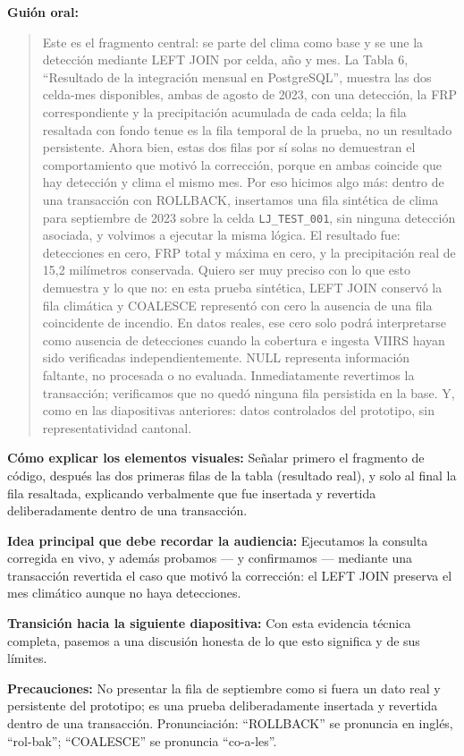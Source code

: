 \documentclass[11pt,a4paper]{article}
\newcommand{\campo}[2]{\par\medskip\noindent\textbf{#1:} #2\par}
\newenvironment{guionoral}{%
  \medskip\noindent\textbf{Gui\'on oral:}\par\smallskip
  \begin{quote}\small
}{%
  \end{quote}
}
\begin{document}
\begin{guionoral}
Este es el fragmento central: se parte del clima como base y se une la
detecci\'on mediante LEFT JOIN por celda, a\~no y mes. La Tabla 6,
``Resultado de la integraci\'on mensual en PostgreSQL'', muestra las
dos celda-mes disponibles, ambas de agosto de 2023, con una detecci\'on,
la FRP correspondiente y la precipitaci\'on acumulada de cada celda; la
fila resaltada con fondo tenue es la fila temporal de la prueba, no un
resultado persistente. Ahora bien, estas dos filas por s\'i solas no
demuestran el comportamiento que motiv\'o la correcci\'on, porque en
ambas coincide que hay detecci\'on y clima el mismo mes. Por eso
hicimos algo m\'as: dentro de una transacci\'on con ROLLBACK,
insertamos una fila sint\'etica de clima para septiembre de 2023 sobre
la celda \texttt{LJ\_TEST\_001}, sin ninguna detecci\'on asociada, y
volvimos a ejecutar la misma l\'ogica. El resultado fue: detecciones en
cero, FRP total y m\'axima en cero, y la precipitaci\'on real de 15,2
mil\'imetros conservada. Quiero ser muy preciso con lo que esto
demuestra y lo que no: en esta prueba sint\'etica, LEFT JOIN conserv\'o
la fila clim\'atica y COALESCE represent\'o con cero la ausencia de una
fila coincidente de incendio. En datos reales, ese cero solo podr\'a
interpretarse como ausencia de detecciones cuando la cobertura e
ingesta VIIRS hayan sido verificadas independientemente. NULL
representa informaci\'on faltante, no procesada o no evaluada.
Inmediatamente revertimos la transacci\'on; verificamos que no qued\'o
ninguna fila persistida en la base. Y, como en las diapositivas
anteriores: datos controlados del prototipo, sin representatividad
cantonal.
\end{guionoral}

\campo{C\'omo explicar los elementos visuales}{Se\~nalar primero el
fragmento de c\'odigo, despu\'es las dos primeras filas de la tabla
(resultado real), y solo al final la fila resaltada, explicando
verbalmente que fue insertada y revertida deliberadamente dentro de
una transacci\'on.}
\campo{Idea principal que debe recordar la audiencia}{Ejecutamos la
consulta corregida en vivo, y adem\'as probamos --- y confirmamos ---
mediante una transacci\'on revertida el caso que motiv\'o la
correcci\'on: el LEFT JOIN preserva el mes clim\'atico aunque no haya
detecciones.}
\campo{Transici\'on hacia la siguiente diapositiva}{Con esta evidencia
t\'ecnica completa, pasemos a una discusi\'on honesta de lo que esto
significa y de sus l\'imites.}
\campo{Precauciones}{No presentar la fila de septiembre como si fuera
un dato real y persistente del prototipo; es una prueba deliberadamente
insertada y revertida dentro de una transacci\'on. Pronunciaci\'on:
``ROLLBACK'' se pronuncia en ingl\'es, ``rol-bak''; ``COALESCE'' se
pronuncia ``co-a-les''.}
\end{document}
